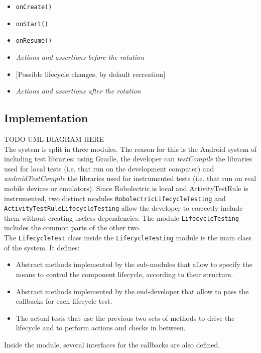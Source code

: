 \documentclass[11pt,a4paper,notitlepage]{article}
\begin{document}
\begin{itemize}
	\begin{itemize}
		\item \texttt{onCreate()}
		\item \texttt{onStart()}
		\item \texttt{onResume()}
		\item \textit{Actions and assertions before the rotation}
		\item $[$Possible lifecycle changes, by default recreation$]$
		\item \textit{Actions and assertions after the rotation}
	\end{itemize}
\end{itemize}

\subsection{Implementation}
TODO UML DIAGRAM HERE \medskip \\
The system is split in three modules. The reason for this is the Android system of including test libraries: using Gradle, the developer can \textit{testCompile} the libraries used for local tests (i.e. that run on the development computer) and \textit{androidTestCompile} the libraries used for instrumented tests (i.e. that run on real mobile devices or emulators). Since Robolectric is local and ActivityTestRule is instrumented, two distinct modules \texttt{RobolectricLifecycleTesting} and \texttt{ActivityTestRuleLifecycleTesting} allow the developer to correctly include them without creating useless dependencies. The module \texttt{LifecycleTesting} includes the common parts of the other two.\medskip \\
The \texttt{LifecycleTest} class inside the \texttt{LifecycleTesting} module is the main class of the system. It defines:
\begin{itemize}
	\item Abstract methods implemented by the sub-modules that allow to specify the means to control the component lifecycle, according to their structure.
	\item Abstract methods implemented by the end-developer that allow to pass the callbacks for each lifecycle test.
	\item The actual tests that use the previous two sets of methods to drive the lifecycle and to perform actions and checks in between.
\end{itemize}
Inside the module, several interfaces for the callbacks are also defined. \bigskip \\
\end{document}
